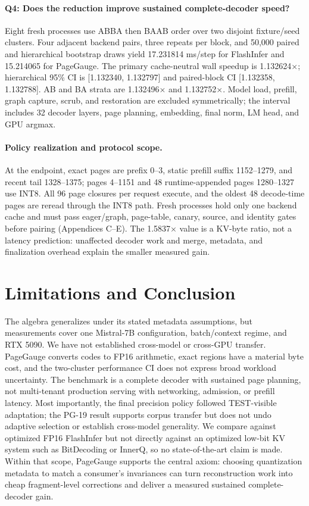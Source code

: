 \documentclass{article}
\begin{document}
\paragraph{Q4: Does the reduction improve sustained complete-decoder speed?}
Eight fresh processes use ABBA then BAAB order over two disjoint fixture/seed
clusters.  Four adjacent backend pairs, three repeats per block, and 50,000
paired and hierarchical bootstrap draws yield 17.231814 ms/step for FlashInfer
and 15.214065 for PageGauge.  The primary cache-neutral wall speedup is
1.132624$\times$; hierarchical 95\% CI is [1.132340, 1.132797] and paired-block
CI [1.132358, 1.132788].  AB and BA strata are 1.132496$\times$ and
1.132752$\times$.  Model load, prefill, graph capture, scrub, and restoration
are excluded symmetrically; the interval includes 32 decoder layers, page
planning, embedding, final norm, LM head, and GPU argmax.

\paragraph{Policy realization and protocol scope.}
At the endpoint, exact pages are prefix 0--3, static prefill suffix 1152--1279,
and recent tail 1328--1375; pages 4--1151 and 48 runtime-appended pages
1280--1327 use INT8.  All 96 page closures per request execute, and the oldest
48 decode-time pages are reread through the INT8 path.  Fresh processes hold
only one backend cache and must pass eager/graph, page-table, canary, source,
and identity gates before pairing (Appendices C--E).  The 1.5837$\times$ value
is a KV-byte ratio, not a latency prediction: unaffected decoder work and merge,
metadata, and finalization overhead explain the smaller measured gain.

\section{Limitations and Conclusion}

The algebra generalizes under its stated metadata assumptions, but measurements
cover one Mistral-7B configuration, batch/context regime, and RTX 5090.  We have
not established cross-model or cross-GPU transfer.  PageGauge converts codes to
FP16 arithmetic, exact regions have a material byte cost, and the two-cluster
performance CI does not express broad workload uncertainty.  The benchmark is
a complete decoder with sustained page planning, not multi-tenant production
serving with networking, admission, or prefill latency.  Most importantly, the
final precision policy followed TEST-visible adaptation; the PG-19 result
supports corpus transfer but does not undo adaptive selection or establish
cross-model generality.  We compare against optimized FP16 FlashInfer but
not directly against an optimized low-bit KV system such as BitDecoding or
InnerQ, so no state-of-the-art claim is made.  Within that scope, PageGauge supports the central
axiom: choosing quantization metadata to match a consumer's invariances can
turn reconstruction work into cheap fragment-level corrections and deliver a
measured sustained complete-decoder gain.

\clearpage



\clearpage
\appendix


\clearpage

\end{document}
